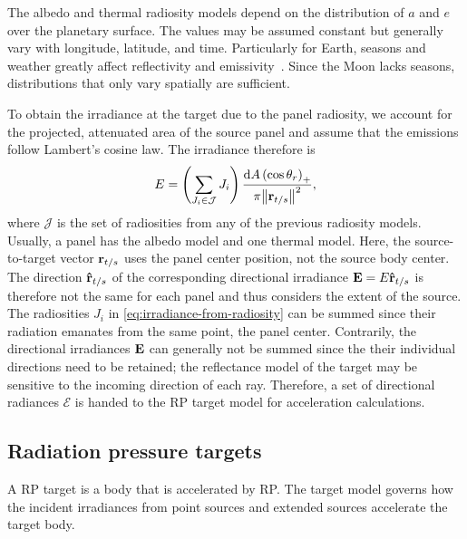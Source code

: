 The albedo and thermal radiosity models depend on the distribution of $a$ and $e$ over the planetary surface. The values may be assumed constant but generally vary with longitude, latitude, and time. Particularly for Earth, seasons and weather greatly affect reflectivity and emissivity~\cite{Goode2001}. Since the Moon lacks seasons, distributions that only vary spatially are sufficient.

To obtain the irradiance at the target due to the panel radiosity, we account for the projected, attenuated area of the source panel and assume that the emissions follow Lambert's cosine law. The irradiance therefore is
\begin{align}
    \label{eq:irradiance-from-radiosity}
    E = \left(\sum_{J_i \in \mathcal{J}} J_i\right) \frac{\dd{A} \left(\cos\theta_r\right)_+}{\pi\norm{\vb r_{t/s}}^2},
\end{align}
where $\mathcal{J}$ is the set of radiosities from any of the previous radiosity models. Usually, a panel has the albedo model and one thermal model. Here, the source-to-target vector $\vb r_{t/s}$ uses the panel center position, not the source body center. The direction $\vu r_{t/s}$ of the corresponding directional irradiance $\vb E = E \vu r_{t/s}$  is therefore not the same for each panel and thus considers the extent of the source. The radiosities $J_i$ in \cref{eq:irradiance-from-radiosity} can be summed since their radiation emanates from the same point, the panel center. Contrarily, the directional irradiances $\vb E$ can generally not be summed since the their  individual directions need to be retained; the reflectance model of the target may be sensitive to the incoming direction of each ray. Therefore, a set of directional radiances $\mathcal{E}$ is handed to the \gls{RP} target model for acceleration calculations.




\subsection{Radiation pressure targets}
\label{subsec:radiation-pressure-targets}

A \gls{RP} target is a body that is accelerated by \gls{RP}. The target model governs how the incident irradiances from point sources and extended sources accelerate the target body.



